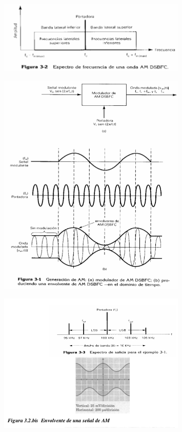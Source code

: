 \documentclass[a4paper,12pt,twoside]{article}
\begin{document}
\begin{figure}[H]
    \centering
    \includegraphics[width=0.8\textwidth]{../img/am.png}
\end{figure}

\begin{figure}[H]
    \centering
    \includegraphics[width=0.8\textwidth]{../img/am2.png}
\end{figure}

\begin{figure}[H]
    \centering
    \includegraphics[width=0.8\textwidth]{../img/am3.png}
\end{figure}
\end{document}
